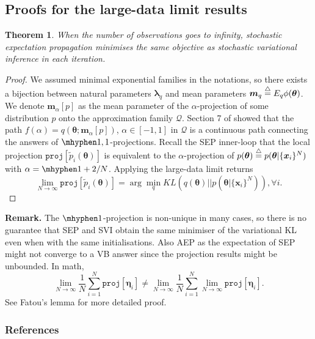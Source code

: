 \documentclass{article} %
\newtheorem{theorem}{Theorem}
\begin{document}
\subsection*{Proofs for the large-data limit results}
\begin{theorem}
When the number of observations goes to infinity, stochastic expectation propagation minimises the same objective as stochastic variational inference in each iteration.
\end{theorem}
\begin{proof}
We assumed minimal exponential families in the notations, so there exists a bijection between natural parameters $\bm{\lambda}_q$ and mean parameters $\bm{m}_q \buildrel\triangle\over = E_q \phi(\bm{\theta})$. We denote $\bm{m}_{\alpha}[p]$ as the mean parameter of the $\alpha$-projection of some distribution $p$ onto the approximation family $\mathcal{Q}$. Section 7 of \cite{amari:alpha_proj} showed that the path $f(\alpha) = q(\bm{\theta}; \bm{m}_{\alpha}[p])$, $\alpha \in [-1, 1]$ in $\mathcal{Q}$ is a continuous path connecting the answers of $\mhyphen 1, 1$-projections. Recall the SEP inner-loop that the local projection $\mathtt{proj}[\tilde{p}_i(\bm{\theta})]$ is equivalent to the $\alpha$-projection of $p(\bm{\theta}) \buildrel\triangle\over = p(\bm{\theta} | \{ \bm{x}_i\}^N)$ with $\alpha = \mhyphen 1 + 2/N$. Applying the large-data limit returns
\begin{equation}
\lim_{N \rightarrow \infty} \mathtt{proj}[\tilde{p}_i(\bm{\theta})] = \arg\min_{q} KL(q(\bm{\theta}) || p(\bm{\theta} | \{ \bm{x}_i\}^N)), \forall i.
\end{equation}
\end{proof}

\textbf{Remark.}
The $\mhyphen 1$-projection is non-unique in many cases, so there is no guarantee that SEP and SVI obtain the same minimiser of the variational KL even when with the same initialisations. Also AEP as the expectation of SEP might not converge to a VB answer since the projection results might be unbounded. In math,
\begin{equation}
\lim_{N \rightarrow \infty} \frac{1}{N} \sum_{i=1}^N \mathtt{proj}[\bm{\eta}_i] \neq \lim_{N \rightarrow \infty} \frac{1}{N} \sum_{i=1}^N \lim_{N \rightarrow \infty} \mathtt{proj}[\bm{\eta}_i].
\end{equation}
See Fatou's lemma for more detailed proof.


\subsubsection*{References}
\renewcommand{\section}[2]{}


\end{document}
